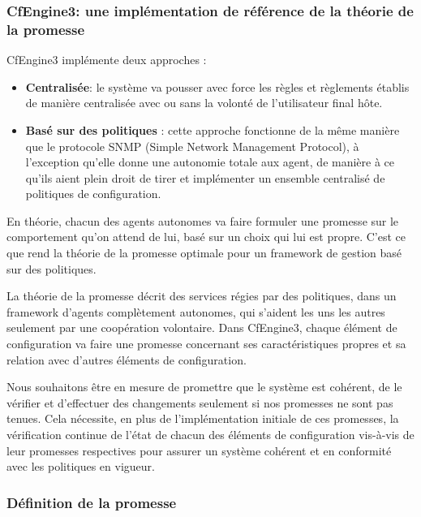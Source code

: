\subsubsection{CfEngine3: une implémentation de référence de la théorie de la
promesse}

CfEngine3 implémente deux approches :

\begin{itemize}
    \item \textbf{Centralisée}: 
        le système va pousser avec force les règles et règlements établis de
        manière centralisée avec ou sans la volonté de l'utilisateur final hôte.
    \item \textbf{Basé sur des politiques} :
        cette approche fonctionne de la même manière que le protocole SNMP
        (Simple Network Management Protocol), à l'exception qu'elle donne une
        autonomie totale aux agent, de manière à ce qu'ils aient plein droit de
        tirer et implémenter un ensemble centralisé de politiques de
        configuration.
\end{itemize}

En théorie, chacun des agents autonomes va faire formuler une promesse sur le
comportement qu'on attend de lui, basé sur un choix qui lui est propre. C'est ce
que rend la théorie de la promesse optimale pour un framework de gestion basé
sur des politiques.

La théorie de la promesse décrit des services régies par des politiques, dans un
framework d'agents complètement autonomes, qui s'aident les uns les autres
seulement par une coopération volontaire. Dans CfEngine3, chaque élément de
configuration va faire une promesse concernant ses caractéristiques propres et
sa relation avec d'autres éléments de configuration.

Nous souhaitons être en mesure de promettre que le système est cohérent, de le
vérifier et d'effectuer des changements seulement si nos promesses ne sont pas
tenues. Cela nécessite, en plus de l'implémentation initiale de ces promesses,
la vérification continue de l'état de chacun des éléments de configuration
vis-à-vis de leur promesses respectives pour assurer un système cohérent et en
conformité avec les politiques en vigueur.


\subsubsection{Définition de la promesse}

